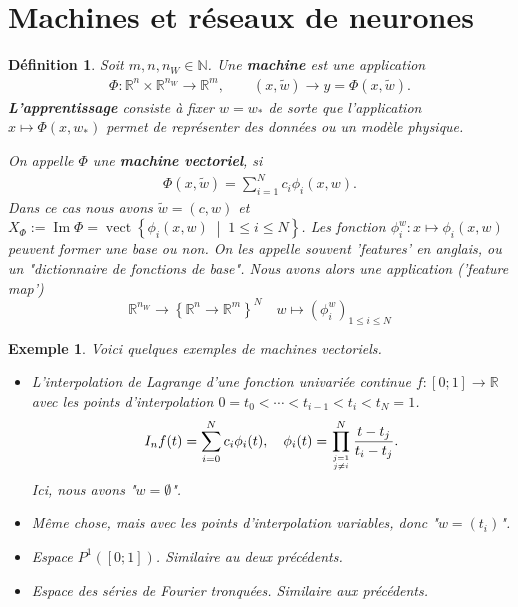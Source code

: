 \documentclass[11pt,a4paper]{article}
\newcommand{\nparammodel}{n_W}
\newcommand{\N}{\mathbb N}
\newcommand{\R}{\mathbb R}
\newcommand{\Set}[1]{\left\{#1\right\}}
\newcommand{\vect}[2]{\operatorname{vect}\left\{#1\;\middle|\;#2\right\}}
\newcommand{\im}{\operatorname{Im}}
\newtheorem{definition}[theorem]{Définition}
\newtheorem{example}[theorem]{Exemple}
\begin{document}
\section{Machines et réseaux de neurones}\label{sec:}
%
%
\begin{definition}\label{definition:}
Soit $m,n,\nparammodel\in\N$. Une \textbf{machine} est une application 
\begin{align*}
\Phi:\R^n\times \R^{\nparammodel}\to \R^m,\qquad (x,\tilde w)\to y = \Phi(x,\tilde w).
\end{align*}
\textbf{L'apprentissage} consiste à fixer $w=w_*$ de sorte que l'application $x\mapsto \Phi(x,w_*)$ permet de représenter des données ou un modèle physique.

On appelle $\Phi$ une \textbf{machine vectoriel}, si
\begin{align*}
\Phi(x,\tilde w) = \sum_{i=1}^N c_i \phi_i(x,w).
\end{align*}
Dans ce cas nous avons $\tilde w = (c,w)$ et $X_{\Phi}:=\im\Phi =\vect{\phi_i(x,w)}{1\le i\le N}$.
Les fonction $\phi_i^{w} : x\mapsto \phi_i(x,w)$ peuvent former une base ou non. On les appelle souvent 'features' en anglais, ou un "dictionnaire de fonctions de base". 
Nous avons alors une application ('feature map')
%
\begin{equation}\label{equation:}
\R^{\nparammodel}\to \Set{\R^n\to \R^m}^N\quad w\mapsto (\phi_i^{w})_{1\le i\le N}
\end{equation}
%
%
\end{definition}
%
%
\begin{example}\label{example:}
Voici quelques exemples de machines vectoriels.
\begin{itemize}
\item L'interpolation de Lagrange d'une fonction univariée continue $f:[0;1]\to\R$ avec les points d'interpolation $0 = t_0 < \cdots < t_{i-1}<t_{i} < t_N=1$.
\begin{align*}
I_n f(t) = \sum_{i=0}^N c_i \phi_i(t),\quad \phi_i(t)=\prod_{j=1\atop j\ne i}^{N} \frac{t-t_j}{t_i-t_j}.
\end{align*}
Ici, nous avons "$w=\emptyset$".
\item Même chose, mais avec les points d'interpolation variables, donc "$w=(t_i)$".
\item Espace $P^1([0;1])$. Similaire au deux précédents.
\item Espace des séries de Fourier tronquées. Similaire aux précédents.
\end{itemize}
\end{example}
\end{document}
